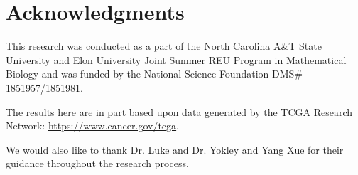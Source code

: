 \documentclass{article}
\begin{document}
	\section{Acknowledgments}
	
	This research was conducted as a part of the North Carolina A\&T State University and Elon University Joint Summer REU Program in Mathematical Biology and was funded by the National Science Foundation DMS\# 1851957/1851981.
	
	The results here are in part based upon data generated by the TCGA Research Network: \href{https://www.cancer.gov/tcga}{https://www.cancer.gov/tcga}.
	
	We would also like to thank Dr. Luke and Dr. Yokley and Yang Xue for their guidance throughout the research process.
	
	
	{\footnotesize
	
	}
\end{document}

